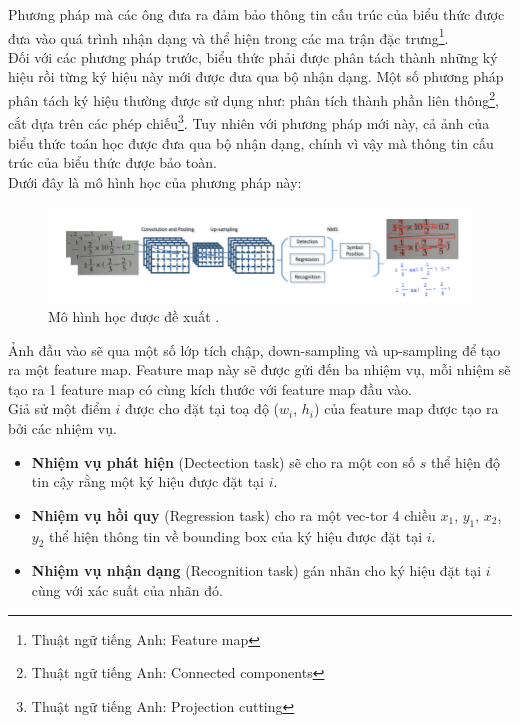 \documentclass[a4paper,12pt]{article}
\begin{document}
	Phương pháp mà các ông đưa ra đảm bảo thông tin cấu trúc của biểu thức được đưa vào quá trình nhận dạng và thể hiện trong các ma trận đặc trưng\footnote{Thuật ngữ tiếng Anh: Feature map}\cite{yanlecun}. \\
	Đối với các phương pháp trước, biểu thức phải được phân tách thành những ký hiệu rồi từng ký hiệu này mới được đưa qua bộ nhận dạng. Một số phương pháp phân tách ký hiệu thường được sử dụng như: phân tích thành phần liên thông\footnote{Thuật ngữ tiếng Anh: Connected components}, cắt dựa trên các phép chiếu\footnote{Thuật ngữ tiếng Anh: Projection cutting}\cite{segment}. Tuy nhiên với phương pháp mới này, cả ảnh của biểu thức toán học được đưa qua bộ nhận dạng, chính vì vậy mà thông tin cấu trúc của biểu thức được bảo toàn. \\
	
	Dưới đây là mô hình học của phương pháp này:\\
	
	\begin{figure}[!h]
		\centering
		\includegraphics[width=0.9\linewidth]{context_aware.png}
		\vspace{0.2cm}
		\caption{Mô hình học được đề xuất \cite{context}.}
		
	\end{figure}
	
	Ảnh đầu vào sẽ qua một số lớp tích chập, down-sampling và up-sampling để tạo ra một feature map. Feature map này sẽ được gửi đến ba nhiệm vụ, mỗi nhiệm sẽ tạo ra 1 feature map có cùng kích thước với feature map đầu vào. \\
	Giả sử một điểm $i$ được cho đặt tại toạ độ ($w_i$, $h_i$) của feature map được tạo ra bởi các nhiệm vụ. 
	\begin{itemize}
		\item \textbf{Nhiệm vụ phát hiện} (Dectection task) sẽ cho ra một con số $s$ thể hiện độ tin cậy rằng một ký hiệu được đặt tại $i$.
		\item \textbf{Nhiệm vụ hồi quy} (Regression task) cho ra một vec-tor 4 chiều {$x_1$, $y_1$, $x_2$, $y_2$} thể hiện thông tin về bounding box của ký hiệu được đặt tại $i$.
		\item\textbf{Nhiệm vụ nhận dạng} (Recognition task) gán nhãn cho ký hiệu đặt tại $i$ cùng với xác suất của nhãn đó. 
	\end{itemize}
	
\end{document}
